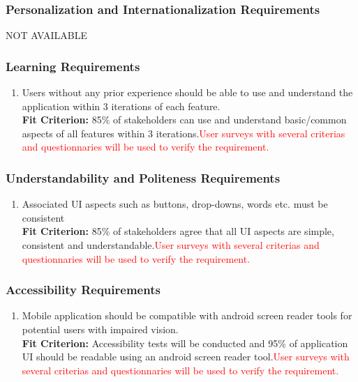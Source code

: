 \documentclass[12pt,letterpaper]{article}
\begin{document}
\subsubsection{Personalization and Internationalization Requirements}
\noindent NOT AVAILABLE

\subsubsection{Learning Requirements}
\begin{enumerate}[resume*] 
	\item Users without any prior experience should be able to use and understand the application within 3 iterations of each feature.\\
	{\textbf{Fit Criterion:} 85\% of stakeholders can use and understand basic/common aspects of all features within 3 iterations.{\textcolor{red}{User surveys with several criterias and questionnaries will be used to verify the requirement.}}}
\end{enumerate}

\subsubsection{Understandability and Politeness Requirements}
\begin{enumerate}[resume*] 
	\item Associated UI aspects such as buttons, drop-downs, words etc. must be consistent\\
	{\textbf{Fit Criterion:} 85\% of stakeholders agree that all UI aspects are simple, consistent and understandable.{\textcolor{red}{User surveys with several criterias and questionnaries will be used to verify the requirement.}}}
\end{enumerate}

\subsubsection{Accessibility Requirements}
\begin{enumerate}[resume*] 
	\item Mobile application should be compatible with android screen reader tools for potential users with impaired vision.\\
	{\textbf{Fit Criterion:} Accessibility tests will be conducted and 95\% of application UI should be readable using an android screen reader tool.{\textcolor{red}{User surveys with several criterias and questionnaries will be used to verify the requirement.}}}
\end{enumerate}
\end{document}
